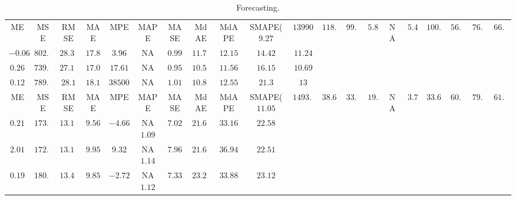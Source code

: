 \begin{table}
{\begin{tabular}{|c|c|c|c|c|c|c|c|c|c|c|}
ME &MSE &RMSE &MAE &MPE &MAPE &MASE &MdAE &MdAPE & SMAPE(%
$9.27$ & $13990.68$ & $118.28$ & $99.08$ & $5.86$ & N\/A &$5.49$ & $100.03$ & $56.13$ & $76.08$ & $66.78$ \\
\bf{$-0.06$} & $802.93$ & $28.34$ & $17.85$ & \bf{$3.96$} & N\/A &$0.99$ & $11.72$ & $12.15$ & \bf{$14.42$} & $11.24$ \\
$0.26$ & \bf{$739.31$} & \bf{$27.19$} & \bf{$17.06$} & $17.61$ & N\/A &\bf{$0.95$} & \bf{$10.52$} & \bf{$11.56$} & $16.15$ & \bf{$10.69$} \\
$0.12$ & $789.6$ & $28.1$ & $18.18$ & $38500.8$ & N\/A &$1.01$ & $10.88$ & $12.55$ & $21.3$ & $13$ \\

ME &MSE &RMSE &MAE &MPE &MAPE &MASE &MdAE &MdAPE & SMAPE(%
$11.05$ & $1493.67$ & $38.65$ & $33.09$ & $19.74$ & N\/A &$3.78$ & $33.65$ & $60.83$ & $79.85$ & $61.23$ \\
$0.21$ & $173.88$ & $13.19$ & \bf{$9.56$} & \bf{$-4.66$} & N\/A\bf{$1.09$} & \bf{$7.02$} & $21.66$ & \bf{$33.16$} & $22.58$ \\
$2.01$ & \bf{$172.23$} & \bf{$13.12$} & $9.95$ & $9.32$ & N\/A$1.14$ & $7.96$ & \bf{$21.61$} & $36.94$ & \bf{$22.51$} \\
\bf{$0.19$} & $180.75$ & $13.44$ & $9.85$ & $-2.72$ & N\/A$1.12$ & $7.33$ & $23.25$ & $33.88$ & $23.12$ \\
\hline
\end{tabular}
}
\caption{Forecasting.}
\label{tab:forecasting}
\end{table}
